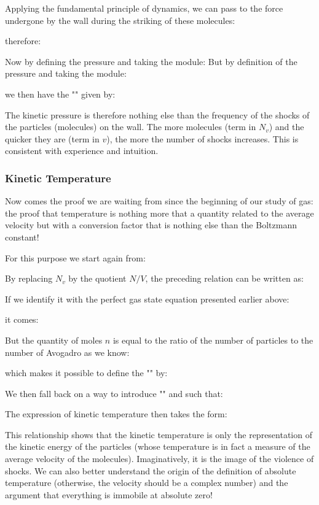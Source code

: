 	Applying the fundamental principle of dynamics, we can pass to the force undergone by the wall during the striking of these molecules:
	
	therefore:
	
	Now by defining the pressure and taking the module:
	But by definition of the pressure and taking the module:
	
	we then have the "" given by:
	
	The kinetic pressure is therefore nothing else than the frequency of the shocks of the particles (molecules) on the wall. The more molecules (term in $N_v$) and the quicker they are (term in $v$), the more the number of shocks increases. This is consistent with experience and intuition.
	
	\pagebreak
	\subsubsection{Kinetic Temperature}
	Now comes the proof we are waiting from since the beginning of our study of gas: the proof that temperature is nothing more that a quantity related to the average velocity but with a conversion factor that is nothing else than the Boltzmann constant!

	For this purpose we start again from:
	
	By replacing $N_v$ by the quotient $N / V$, the preceding relation can be written as:
	
	If we identify it with the perfect gas state equation presented earlier above:
	
	it comes:
	
	But the quantity of moles $n$ is equal to the ratio of the number of particles to the number of Avogadro as we know:
	
	which makes it possible to define the "" by:
	
	We then fall back on a way to introduce "" and such that:
	
	The expression of kinetic temperature then takes the form:
	
	This relationship shows that the kinetic temperature is only the representation of the kinetic energy of the particles (whose temperature is in fact a measure of the average velocity of the molecules). Imaginatively, it is the image of the violence of shocks. We can also better understand the origin of the definition of absolute temperature (otherwise, the velocity should be a complex number) and the argument that everything is immobile at absolute zero!
	
